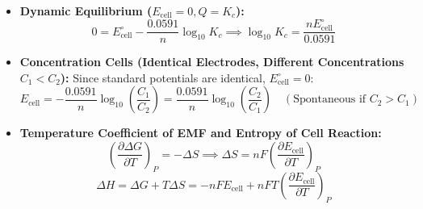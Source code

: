 \documentclass[10pt,a4paper]{article}
\begin{document}
\begin{formulabox}
\begin{itemize}
  \item \textbf{Dynamic Equilibrium ($E_{\text{cell}} = 0, Q = K_c$):}
  \begin{equation}
    0 = E_{\text{cell}}^\circ - \frac{0.0591}{n}\log_{10} K_c \implies \log_{10} K_c = \frac{n E_{\text{cell}}^\circ}{0.0591}
  \end{equation}
  \item \textbf{Concentration Cells (Identical Electrodes, Different Concentrations $C_1 < C_2$):}
  Since standard potentials are identical, $E_{\text{cell}}^\circ = 0$:
  \begin{equation}
    E_{\text{cell}} = -\frac{0.0591}{n}\log_{10}\left(\frac{C_1}{C_2}\right) = \frac{0.0591}{n}\log_{10}\left(\frac{C_2}{C_1}\right) \quad (\text{Spontaneous if } C_2 > C_1)
  \end{equation}
  \item \textbf{Temperature Coefficient of EMF and Entropy of Cell Reaction:}
  \begin{equation}
    \left(\frac{\partial \Delta G}{\partial T}\right)_P = -\Delta S \implies \Delta S = n F \left(\frac{\partial E_{\text{cell}}}{\partial T}\right)_P
  \end{equation}
  \begin{equation}
    \Delta H = \Delta G + T \Delta S = -n F E_{\text{cell}} + n F T \left(\frac{\partial E_{\text{cell}}}{\partial T}\right)_P
  \end{equation}
\end{itemize}
\end{formulabox}
\end{document}
